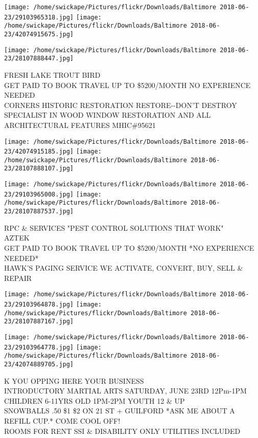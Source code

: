 \documentclass[10pt,letterpaper]{article}
\begin{document}
\texttt{[image: /home/swickape/Pictures/flickr/Downloads/Baltimore 2018-06-23/29103965318.jpg]}
\texttt{[image: /home/swickape/Pictures/flickr/Downloads/Baltimore 2018-06-23/42074915675.jpg]}

\vspace{0.25in}
\texttt{[image: /home/swickape/Pictures/flickr/Downloads/Baltimore 2018-06-23/28107888447.jpg]}

FRESH LAKE TROUT BIRD\\
GET PAID TO BOOK TRAVEL UP TO \$5200/MONTH NO EXPERIENCE NEEDED\\
CORNERS HISTORIC RESTORATION RESTORE{-}{-}DON'T DESTROY SPECIALIST IN WOOD WINDOW RESTORATION AND ALL ARCHITECTURAL FEATURES MHIC\#95621\\
\pagebreak

\texttt{[image: /home/swickape/Pictures/flickr/Downloads/Baltimore 2018-06-23/42074915185.jpg]}
\texttt{[image: /home/swickape/Pictures/flickr/Downloads/Baltimore 2018-06-23/28107888107.jpg]}

\texttt{[image: /home/swickape/Pictures/flickr/Downloads/Baltimore 2018-06-23/29103965008.jpg]}
\texttt{[image: /home/swickape/Pictures/flickr/Downloads/Baltimore 2018-06-23/28107887537.jpg]}

RPC \& SERVICES "PEST CONTROL SOLUTIONS THAT WORK"\\
AZTEK\\
GET PAID TO BOOK TRAVEL UP TO \$5200/MONTH *NO EXPERIENCE NEEDED*\\
HAWK'S PAGING SERVICE WE ACTIVATE, CONVERT, BUY, SELL \& REPAIR\\
\pagebreak

\texttt{[image: /home/swickape/Pictures/flickr/Downloads/Baltimore 2018-06-23/29103964878.jpg]}
\texttt{[image: /home/swickape/Pictures/flickr/Downloads/Baltimore 2018-06-23/28107887167.jpg]}

\texttt{[image: /home/swickape/Pictures/flickr/Downloads/Baltimore 2018-06-23/29103964778.jpg]}
\texttt{[image: /home/swickape/Pictures/flickr/Downloads/Baltimore 2018-06-23/42074889705.jpg]}

K YOU OPPING HERE YOUR BUSINESS\\
INTRODUCTORY MARTIAL ARTS SATURDAY, JUNE 23RD 12Pm{-}1PM CHILDREN 6{-}11YRS OLD 1PM{-}2PM YOUTH 12 \& UP\\
SNOWBALLS .50 \$1 \$2 ON 21 ST + GUILFORD *ASK ME ABOUT A REFILL CUP.* COME COOL OFF!\\
ROOMS FOR RENT SSI \& DISABILITY ONLY UTILITIES INCLUDED\\
\pagebreak
\end{document}
